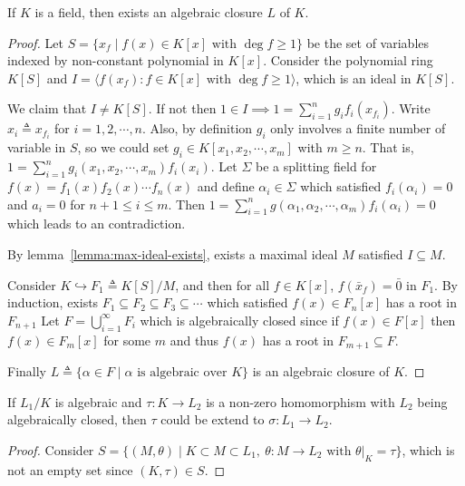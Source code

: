 \begin{theorem}
  If $K$ is a field, then exists an algebraic closure $L$ of $K$.

  \begin{proof}
    Let $S = \{ x_f \mid f(x) \in K[x] \text{ with } \deg f \geq 1 \}$ be the set of variables indexed by non-constant
    polynomial in $K[x]$. Consider the polynomial ring $K[S]$ and $I = \langle f(x_f) : f \in K[x] \text{ with } \deg f \geq 1 \rangle$,
    which is an ideal in $K[S]$.

    We claim that $I \neq K[S]$. If not then $1 \in I \implies 1 = \sum_{i = 1}^n g_i f_i(x_{f_i})$.
    Write $x_i \triangleq x_{f_i}$ for $i = 1, 2, \cdots, n$. Also, by definition $g_i$ only involves a finite number of
    variable in $S$, so we could set $g_i \in K[x_1, x_2, \cdots, x_m]$ with $m \geq n$. That is, $1 = \sum_{i = 1}^n g_i(x_1, x_2,
    \cdots, x_m) f_i(x_i)$. Let $\Sigma$ be a splitting field for $f(x) = f_1(x) f_2(x) \cdots f_n(x)$ and define $\alpha_i \in \Sigma$
    which satisfied $f_i(\alpha_i) = 0$ and $a_i = 0$ for $n+1 \leq i \leq m$. Then
    $1 = \sum_{i = 1}^n g(\alpha_1, \alpha_2, \cdots, \alpha_m) f_i(\alpha_i) = 0$ which leads to an contradiction.

    By lemma~\ref{lemma:max-ideal-exists}, exists a maximal ideal $M$ satisfied $I \subseteq M$.

    Consider $K \hookrightarrow F_1 \triangleq K[S] / M$, and then for all $f \in K[x]$, $f(\bar{x}_f) = \bar{0}$ in $F_1$.
    By induction, exists $F_1 \subseteq F_2 \subseteq F_3 \subseteq \cdots$ which satisfied $f(x) \in F_n[x]$ has a root in $F_{n+1}$
    Let $F = \bigcup_{i = 1}^\infty F_i$ which is algebraically closed since if $f(x) \in F[x]$ then $f(x) \in F_m[x]$
    for some $m$ and thus $f(x)$ has a root in $F_{m+1} \subseteq F$.

    Finally $L \triangleq \{ \alpha \in F \mid \alpha \text{ is algebraic over } K \}$ is an algebraic closure of $K$.
  \end{proof}

  \begin{lemma} \label{lemma:homo-extend-to-alg-closed-extension}
    If $L_1 / K$ is algebraic and $\tau: K \to L_2$ is a non-zero homomorphism with $L_2$ being algebraically closed,
    then $\tau$ could be extend to $\sigma: L_1 \to L_2$.

    \begin{proof}
      Consider $S = \{ (M, \theta) \mid K \subset M \subset L_1,\ \theta: M \to L_2 \text{ with } \theta\big|_K = \tau\}$,
      which is not an empty set since $(K, \tau) \in S$.


\end{proof}
\end{lemma}
\end{theorem}
